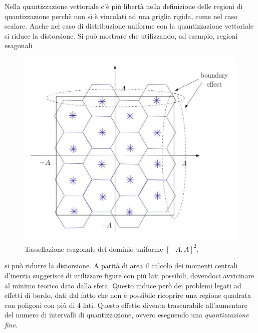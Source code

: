 Nella quantizzazione vettoriale c'\`e più libertà nella definizione delle regioni di quantizzazione perchè non si è vincolati ad una griglia rigida, come nel caso scalare. Anche nel caso di distribuzione uniforme con la quantizzazione vettoriale si riduce la distorsione. Si pu\`o mostrare che utilizzando, ad esempio, regioni esagonali
\begin{figure}[H]
    \centering
    \includegraphics[scale=0.2]{img/hex.jpg}
    \caption{Tassellazione esagonale del dominio uniforme $[-A, A]^2$.}
    \label{fig:my_label}
\end{figure}
si pu\`o ridurre la distorsione. A parit\`a di area il calcolo dei momenti centrali d'inerzia suggerisce di utilizzare figure con pi\`u lati possibili, dovendoci avvicinare al minimo teorico dato dalla sfera. Questo induce per\`o dei problemi legati ad effetti di bordo, dati dal fatto che non \`e possibile ricoprire una regione quadrata con poligoni con pi\`u di 4 lati. Questo effetto diventa trascurabile all'aumentare del numero di intervalli di quantizzazione, ovvero eseguendo una \textit{quantizzazione fine}. 

